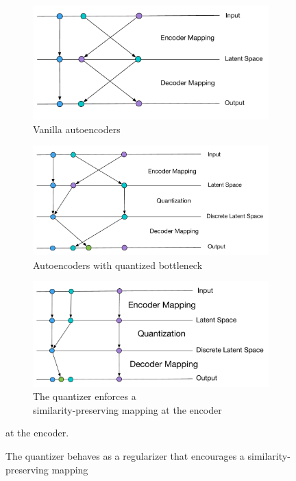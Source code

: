 \documentclass[letterpaper]{article} %
\begin{document}
\begin{figure}[!ht]
\captionsetup[subfigure]{justification=centering}
\centering
	\begin{subfigure}{.45\textwidth}
	\centering
	\includegraphics[width=.8\linewidth]{twolayer_original.pdf}
	\caption{Vanilla autoencoders}
		\label{fig: q1}
	\end{subfigure}
\begin{subfigure}{.45\textwidth}
\centering
	\includegraphics[width=.8\linewidth]{twolayer_noise.pdf}
	\caption{Autoencoders with quantized bottleneck}
		\label{fig: q2}
\end{subfigure}
\begin{subfigure}{.45\textwidth}
\centering
\includegraphics[width=.8\linewidth]{BetterMapping.pdf}
\caption{The quantizer enforces a\\ similarity-preserving mapping at the encoder}
\label{fig:sub3}
\end{subfigure}
\caption{The quantizer behaves as a regularizer that encourages a similarity-preserving mapping} at the encoder.
\label{fig:test}
\end{figure}
\end{document}
